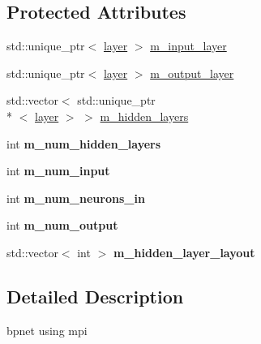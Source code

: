 \subsection*{Protected Attributes}
\begin{DoxyCompactItemize}
\item 
std\-::unique\-\_\-ptr$<$ \hyperlink{structlayer}{layer} $>$ \hyperlink{classbpnet__mpi_a0aa75e3e05f2506f42772dde626749f9}{m\-\_\-input\-\_\-layer}
\item 
std\-::unique\-\_\-ptr$<$ \hyperlink{structlayer}{layer} $>$ \hyperlink{classbpnet__mpi_ad734a9a35fb6f3deeccf4bc94a9c1ca4}{m\-\_\-output\-\_\-layer}
\item 
std\-::vector$<$ std\-::unique\-\_\-ptr\\*
$<$ \hyperlink{structlayer}{layer} $>$ $>$ \hyperlink{classbpnet__mpi_a590981e3b36b8c076fea1206a3d520ef}{m\-\_\-hidden\-\_\-layers}
\item 
\hypertarget{classbpnet__mpi_aeaa870547e30b4b055e3618434f23f4f}{int {\bfseries m\-\_\-num\-\_\-hidden\-\_\-layers}}\label{classbpnet__mpi_aeaa870547e30b4b055e3618434f23f4f}

\item 
\hypertarget{classbpnet__mpi_a77862b6e4d07f64a8c9d3cd3eef50fb5}{int {\bfseries m\-\_\-num\-\_\-input}}\label{classbpnet__mpi_a77862b6e4d07f64a8c9d3cd3eef50fb5}

\item 
\hypertarget{classbpnet__mpi_acdcfd12a7827130fb46bf08107356e1e}{int {\bfseries m\-\_\-num\-\_\-neurons\-\_\-in}}\label{classbpnet__mpi_acdcfd12a7827130fb46bf08107356e1e}

\item 
\hypertarget{classbpnet__mpi_adc3cc093064dbfb15aac26bfcccfcdc5}{int {\bfseries m\-\_\-num\-\_\-output}}\label{classbpnet__mpi_adc3cc093064dbfb15aac26bfcccfcdc5}

\item 
\hypertarget{classbpnet__mpi_aa033d39bb384cb2858c53201ca2991d9}{std\-::vector$<$ int $>$ {\bfseries m\-\_\-hidden\-\_\-layer\-\_\-layout}}\label{classbpnet__mpi_aa033d39bb384cb2858c53201ca2991d9}

\end{DoxyCompactItemize}


\subsection{Detailed Description}
bpnet using mpi 

